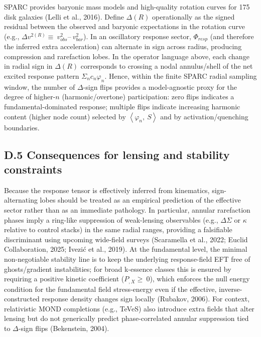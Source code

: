 \documentclass[11pt]{article}
\begin{document}
SPARC provides baryonic mass models and high-quality rotation curves for 175 disk galaxies (Lelli et al., 2016). Define \(\Delta(R)\) operationally \citep{McGaughSchombert2014ML, Ivezic2019LSST} as the signed residual between the observed and baryonic expectations in the rotation curve (e.g., \(\Delta v^{2(R)} \equiv \ v_{obs}^{2}–\ v_{bar}^{2}\)). In an oscillatory response sector, \(\Phi_{resp}\) (and therefore the inferred extra acceleration) can alternate in sign across radius, producing compression and rarefaction lobes. In the operator language above, each change in radial sign in \(\Delta(R)\) corresponds to crossing a nodal annulus/shell of the net excited response pattern \(\Sigma_{n}c_{n}\varphi_{n}\). Hence, within the finite SPARC radial sampling window, the number of \(\Delta\)-sign flips provides a model-agnostic proxy for the degree of higher-\(n\) (harmonic/overtone) participation: zero flips indicates a fundamental-dominated response; multiple flips indicate increasing harmonic content (higher node count) selected by \(\left\langle \varphi_{n},\ S \right\rangle\) and by activation/quenching boundaries.

\subsection{D.5 Consequences for lensing and stability constraints}\label{d.5-consequences-for-lensing-and-stability-constraints}

Because the response tensor is effectively inferred from kinematics, sign-alternating lobes should be treated as an empirical prediction of the effective sector rather than as an immediate pathology. In particular, annular rarefaction phases imply a ring-like suppression of weak-lensing observables (e.g., \(\Delta\Sigma\) or \(\kappa\) relative to control stacks) in the same radial ranges, providing a falsifiable discriminant using upcoming wide-field surveys (Scaramella et al., 2022; Euclid Collaboration, 2025; Ivezić et al., 2019). At the fundamental level, \citep{BuniyHsuMurray2006NEC, Rubakov2006NEC, Rubakov2014NECReview} the minimal non-negotiable stability line is to keep the underlying response-field EFT free of ghosts/gradient instabilities; for broad k-essence classes this is ensured by requiring a positive kinetic coefficient (\(P_{,X} \geq \ 0\)), which enforces the null energy condition for the fundamental field stress-energy even if the effective, inverse-constructed response density changes sign locally (Rubakov, 2006). For context, relativistic MOND completions (e.g., TeVeS) also introduce extra fields that alter lensing but do not generically predict phase-correlated annular suppression tied to \(\Delta\)-sign flips (Bekenstein, 2004).
\end{document}
